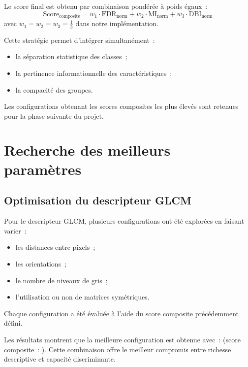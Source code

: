 Le score final est obtenu par combinaison pondérée à poids égaux~:
\begin{equation}
  \mathrm{Score}_{\mathrm{composite}}
  = w_1 \cdot \mathrm{FDR}_{\mathrm{norm}}
  + w_2 \cdot \mathrm{MI}_{\mathrm{norm}}
  + w_3 \cdot \mathrm{DBI}_{\mathrm{norm}}
\end{equation}
avec $w_1 = w_2 = w_3 = \tfrac{1}{3}$ dans notre implémentation.

Cette stratégie permet d'intégrer simultanément~:
\begin{itemize}[leftmargin=1.4em,itemsep=2pt]
  \item la séparation statistique des classes~;
  \item la pertinence informationnelle des caractéristiques~;
  \item la compacité des groupes.
\end{itemize}

Les configurations obtenant les scores composites les plus élevés sont retenues pour la phase
suivante du projet.

\section{Recherche des meilleurs paramètres}

\subsection{Optimisation du descripteur GLCM}

Pour le descripteur GLCM, plusieurs configurations ont été explorées en faisant varier~:
\begin{itemize}[leftmargin=1.4em,itemsep=2pt]
  \item les distances entre pixels~;
  \item les orientations~;
  \item le nombre de niveaux de gris~;
  \item l'utilisation ou non de matrices symétriques.
\end{itemize}

Chaque configuration a été évaluée à l'aide du score composite précédemment défini.

Les résultats montrent que la meilleure configuration est obtenue avec~: \glcmParams{}
(score composite~: \glcmScore). Cette combinaison offre le meilleur compromis entre richesse
descriptive et capacité discriminante.


